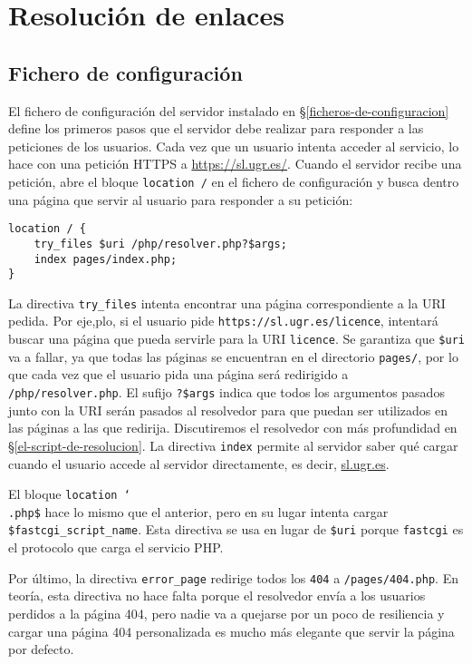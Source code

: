 \chapter{Resolución de enlaces}\label{resolucion-de-enlaces}

\section{Fichero de configuración}\label{fichero-de-configuracion}

El fichero de configuración del servidor instalado en \S\ref{ficheros-de-configuracion} define los primeros pasos que el servidor debe realizar para responder a las peticiones de los usuarios.
Cada vez que un usuario intenta acceder al servicio, lo hace con una petición HTTPS a \url{https://sl.ugr.es/}.
Cuando el servidor recibe una petición, abre el bloque \texttt{location /} en el fichero de configuración y busca dentro una página que servir al usuario para responder a su petición:

\begin{lstlisting}
location / {
	try_files $uri /php/resolver.php?$args;
	index pages/index.php;
}
\end{lstlisting}

La directiva \texttt{try\_files} intenta encontrar una página correspondiente a la URI pedida.
Por eje,plo, si el usuario pide \texttt{https://sl.ugr.es/licence}, intentará buscar una página que pueda servirle para la URI \texttt{licence}.
Se garantiza que \texttt{\$uri} va a fallar, ya que todas las páginas se encuentran en el directorio \texttt{pages/}, por lo que cada vez que el usuario pida una página será redirigido a \texttt{/php/resolver.php}.
El sufijo \texttt{?\$args} indica que todos los argumentos pasados junto con la URI serán pasados al resolvedor para que puedan ser utilizados en las páginas a las que redirija.
Discutiremos el resolvedor con más profundidad en \S\ref{el-script-de-resolucion}.
La directiva \texttt{index} permite al servidor saber qué cargar cuando el usuario accede al servidor directamente, es decir, \url{sl.ugr.es}.

El bloque \texttt{location \mysim\char`\\.php\$} hace lo mismo que el anterior, pero en su lugar intenta cargar \texttt{\$fastcgi\_script\_name}.
Esta directiva se usa en lugar de \texttt{\$uri} porque \texttt{fastcgi} es el protocolo que carga el servicio PHP.

Por último, la directiva \texttt{error\_page} redirige todos los \texttt{404} a \texttt{/pages/404.php}.
En teoría, esta directiva no hace falta porque el resolvedor envía a los usuarios perdidos a la página 404, pero nadie va a quejarse por un poco de resiliencia y cargar una página 404 personalizada es mucho más elegante que servir la página por defecto.

